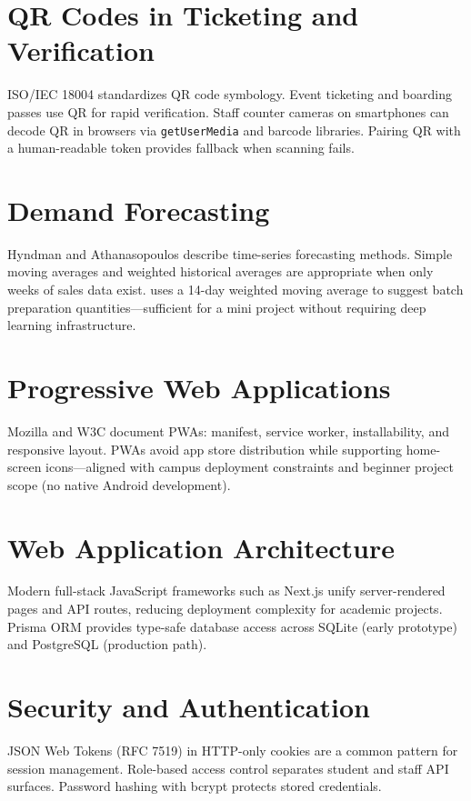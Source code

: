 \section{QR Codes in Ticketing and Verification}
ISO/IEC 18004 standardizes QR code symbology. Event ticketing and boarding passes use QR for rapid verification. Staff counter cameras on smartphones can decode QR in browsers via \texttt{getUserMedia} and barcode libraries. Pairing QR with a human-readable token provides fallback when scanning fails.

\section{Demand Forecasting}
Hyndman and Athanasopoulos describe time-series forecasting methods. Simple moving averages and weighted historical averages are appropriate when only weeks of sales data exist. \ShortTitle{} uses a 14-day weighted moving average to suggest batch preparation quantities---sufficient for a mini project without requiring deep learning infrastructure.

\section{Progressive Web Applications}
Mozilla and W3C document PWAs: manifest, service worker, installability, and responsive layout. PWAs avoid app store distribution while supporting home-screen icons---aligned with campus deployment constraints and beginner project scope (no native Android development).

\section{Web Application Architecture}
Modern full-stack JavaScript frameworks such as Next.js unify server-rendered pages and API routes, reducing deployment complexity for academic projects. Prisma ORM provides type-safe database access across SQLite (early prototype) and PostgreSQL (production path).

\section{Security and Authentication}
JSON Web Tokens (RFC 7519) in HTTP-only cookies are a common pattern for session management. Role-based access control separates student and staff API surfaces. Password hashing with bcrypt protects stored credentials.

